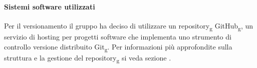 \paragraph{Sistemi software utilizzati}
Per il versionamento il gruppo ha deciso di utilizzare un repository\textsubscript{g} GitHub\textsubscript{g}, un servizio di hosting per progetti software che implementa uno strumento di controllo versione distribuito Git\textsubscript{g}.
Per informazioni più approfondite sulla struttura e la gestione del repository\textsubscript{g} si veda sezione .